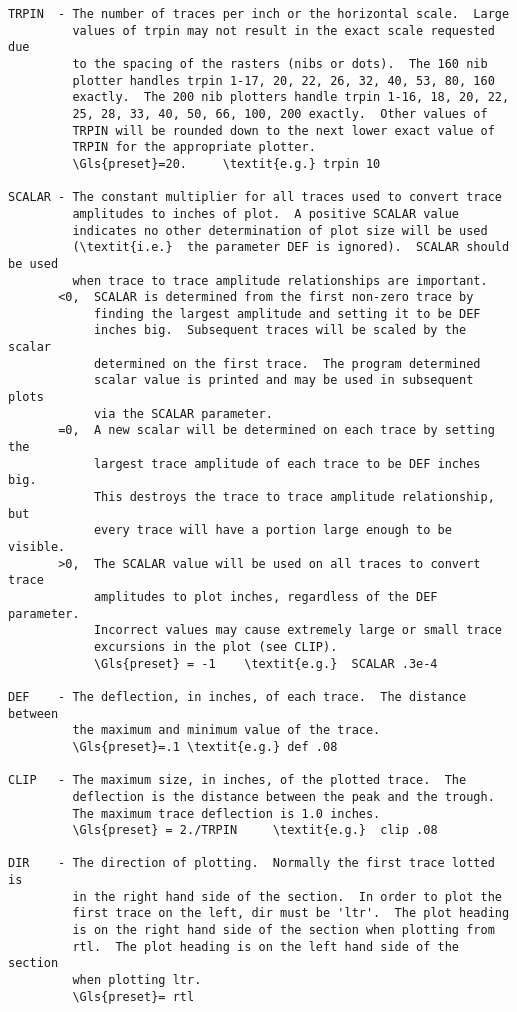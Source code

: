 \begin{verbatim}
TRPIN  - The number of traces per inch or the horizontal scale.  Large
         values of trpin may not result in the exact scale requested due
         to the spacing of the rasters (nibs or dots).  The 160 nib
         plotter handles trpin 1-17, 20, 22, 26, 32, 40, 53, 80, 160
         exactly.  The 200 nib plotters handle trpin 1-16, 18, 20, 22,
         25, 28, 33, 40, 50, 66, 100, 200 exactly.  Other values of
         TRPIN will be rounded down to the next lower exact value of
         TRPIN for the appropriate plotter.
         \Gls{preset}=20.     \textit{e.g.} trpin 10

SCALAR - The constant multiplier for all traces used to convert trace
         amplitudes to inches of plot.  A positive SCALAR value
         indicates no other determination of plot size will be used
         (\textit{i.e.}  the parameter DEF is ignored).  SCALAR should be used
         when trace to trace amplitude relationships are important.
       <0,  SCALAR is determined from the first non-zero trace by
            finding the largest amplitude and setting it to be DEF
            inches big.  Subsequent traces will be scaled by the scalar
            determined on the first trace.  The program determined
            scalar value is printed and may be used in subsequent plots
            via the SCALAR parameter.
       =0,  A new scalar will be determined on each trace by setting the
            largest trace amplitude of each trace to be DEF inches big.
            This destroys the trace to trace amplitude relationship, but
            every trace will have a portion large enough to be visible.
       >0,  The SCALAR value will be used on all traces to convert trace
            amplitudes to plot inches, regardless of the DEF parameter.
            Incorrect values may cause extremely large or small trace
            excursions in the plot (see CLIP).
            \Gls{preset} = -1    \textit{e.g.}  SCALAR .3e-4

DEF    - The deflection, in inches, of each trace.  The distance between
         the maximum and minimum value of the trace.
         \Gls{preset}=.1 \textit{e.g.} def .08

CLIP   - The maximum size, in inches, of the plotted trace.  The
         deflection is the distance between the peak and the trough.
         The maximum trace deflection is 1.0 inches.
         \Gls{preset} = 2./TRPIN     \textit{e.g.}  clip .08

DIR    - The direction of plotting.  Normally the first trace lotted is
         in the right hand side of the section.  In order to plot the
         first trace on the left, dir must be 'ltr'.  The plot heading
         is on the right hand side of the section when plotting from
         rtl.  The plot heading is on the left hand side of the section
         when plotting ltr.
         \Gls{preset}= rtl


\end{verbatim}
